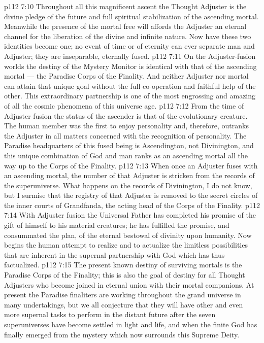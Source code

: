 \vs p112 7:10 Throughout all this magnificent ascent the Thought Adjuster is the divine pledge of the future and full spiritual stabilization of the ascending mortal. Meanwhile the presence of the mortal free will affords the Adjuster an eternal channel for the liberation of the divine and infinite nature. Now have these two identities become one; no event of time or of eternity can ever separate man and Adjuster; they are inseparable, eternally fused.
\vs p112 7:11 \pc On the Adjuster\hyp{}fusion worlds the destiny of the Mystery Monitor is identical with that of the ascending mortal --- the Paradise Corps of the Finality. And neither Adjuster nor mortal can attain that unique goal without the full co\hyp{}operation and faithful help of the other. This extraordinary partnership is one of the most engrossing and amazing of all the cosmic phenomena of this universe age.
\vs p112 7:12 From the time of Adjuster fusion the status of the ascender is that of the evolutionary creature. The human member was the first to enjoy personality and, therefore, outranks the Adjuster in all matters concerned with the recognition of personality. The Paradise headquarters of this fused being is Ascendington, not Divinington, and this unique combination of God and man ranks as an ascending mortal all the way up to the Corps of the Finality.
\vs p112 7:13 When once an Adjuster fuses with an ascending mortal, the number of that Adjuster is stricken from the records of the superuniverse. What happens on the records of Divinington, I do not know, but I surmise that the registry of that Adjuster is removed to the secret circles of the inner courts of Grandfanda, the acting head of the Corps of the Finality.
\vs p112 7:14 With Adjuster fusion the Universal Father has completed his promise of the gift of himself to his material creatures; he has fulfilled the promise, and consummated the plan, of the eternal bestowal of divinity upon humanity. Now begins the human attempt to realize and to actualize the limitless possibilities that are inherent in the supernal partnership with God which has thus factualized.
\vs p112 7:15 \pc The present known destiny of surviving mortals is the Paradise Corps of the Finality; this is also the goal of destiny for all Thought Adjusters who become joined in eternal union with their mortal companions. At present the Paradise finaliters are working throughout the grand universe in many undertakings, but we all conjecture that they will have other and even more supernal tasks to perform in the distant future after the seven superuniverses have become settled in light and life, and when the finite God has finally emerged from the mystery which now surrounds this Supreme Deity.
